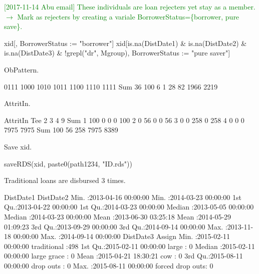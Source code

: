 \textcolor{green}{[2017-11-14 Abu email] These individuals are loan rejecters yet stay as a member. $\rightarrow$ Mark as rejecters by creating a variale \textsf{BorrowerStatus}=\{borrower, pure save\}.}
\begin{Schunk}
\begin{Sinput}
xid[, BorrowerStatus := "borrower"]
xid[is.na(DistDate1) & is.na(DistDate2) & is.na(DistDate3) & !grepl("dr", Mgroup), 
	BorrowerStatus := "pure saver"]
\end{Sinput}
\end{Schunk}
\textsf{ObPattern}.
\begin{Schunk}
\begin{Soutput}

0111 1000 1010 1011 1100 1110 1111  Sum 
  36  100    6    1   28   82 1966 2219 
\end{Soutput}
\end{Schunk}
\textsf{AttritIn}.
\begin{Schunk}
\begin{Soutput}
     AttritIn
Tee      2    3    4    9  Sum
  1    100    0    0    0  100
  2      0   56    0    0   56
  3      0    0  258    0  258
  4      0    0    0 7975 7975
  Sum  100   56  258 7975 8389
\end{Soutput}
\end{Schunk}
Save \textsf{xid}. 
\begin{Schunk}
\begin{Sinput}
saveRDS(xid, paste0(path1234, "ID.rds"))
\end{Sinput}
\end{Schunk}
Traditional loans are disbursed 3 times.
\begin{Schunk}
\begin{Soutput}
   DistDate1                     DistDate2                  
 Min.   :2013-04-16 00:00:00   Min.   :2014-03-23 00:00:00  
 1st Qu.:2013-04-22 00:00:00   1st Qu.:2014-03-23 00:00:00  
 Median :2013-05-05 00:00:00   Median :2014-03-23 00:00:00  
 Mean   :2013-06-30 03:25:18   Mean   :2014-05-29 01:09:23  
 3rd Qu.:2013-09-29 00:00:00   3rd Qu.:2014-09-14 00:00:00  
 Max.   :2013-11-18 00:00:00   Max.   :2014-09-14 00:00:00  
   DistDate3                                Assign   
 Min.   :2015-02-11 00:00:00   traditional     :498  
 1st Qu.:2015-02-11 00:00:00   large           :  0  
 Median :2015-02-11 00:00:00   large grace     :  0  
 Mean   :2015-04-21 18:30:21   cow             :  0  
 3rd Qu.:2015-08-11 00:00:00   drop outs       :  0  
 Max.   :2015-08-11 00:00:00   forced drop outs:  0  
\end{Soutput}
\end{Schunk}
